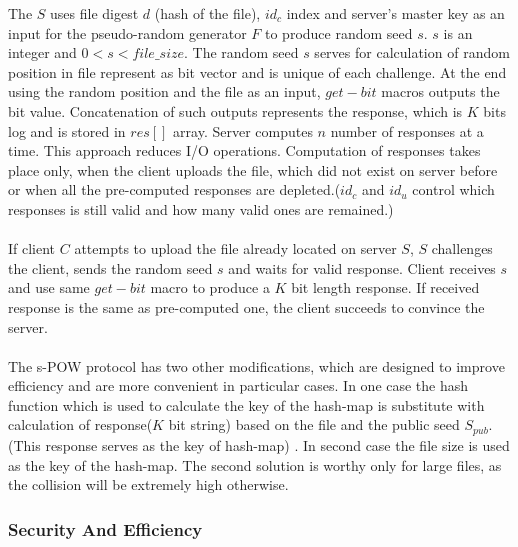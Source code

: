 \documentclass[12pt]{article}
\begin{document}
The $S$ uses file digest $d$ (hash of the file), $id_c$ index and server's master key as an input for the  pseudo-random generator $F$ to produce random seed $s$. $s$ is an integer and $0 < s < file\_size $. The random seed $s$ serves for calculation of random position in file represent as bit vector and is unique of each challenge. At the end  using the random  position and the file as an input, $get-bit$ macros outputs the bit value. Concatenation of such outputs represents the response, which is $K$ bits log and is stored in $res[]$ array. Server computes $n$ number of responses at a time. This approach reduces I/O operations. Computation of responses takes place only, when the client uploads the file, which did not exist on server before or when  all the pre-computed responses are depleted.($id_c$ and $id_u$ control which responses is still valid and how many valid ones are remained.)\\\\
If client $C$ attempts to upload the file already located on server $S$, $S$ challenges the client, sends the random seed $s$ and waits for valid response. Client receives $s$ and use same $get-bit$ macro to produce a $K$ bit length response. If received response is the same as pre-computed one, the client succeeds to convince the server.\\\\
The s-POW protocol has two other modifications, which are designed to improve efficiency and are more convenient in particular cases. In one case the hash function which is used to calculate the key of the hash-map is substitute with calculation of response($K$ bit string) based on the file and the public seed $S_{pub}$. (This response serves as the key of hash-map) . In second case the file size is used as the key of the hash-map. The second solution is worthy only for large files, as the collision will be extremely high otherwise.

\subsubsection{Security And Efficiency}
\label{subsub:secAndeff2}
\end{document}
